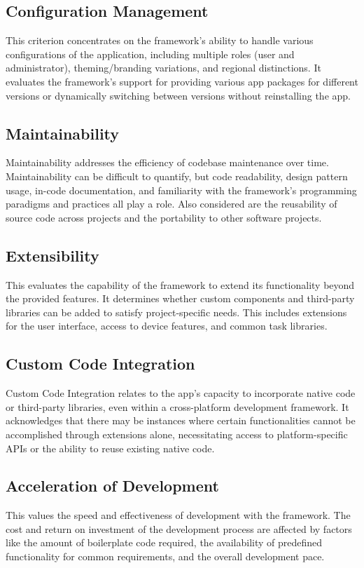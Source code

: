 \subsection{Configuration Management}
This criterion concentrates on the framework's ability to handle various configurations of the application, including multiple roles (user and administrator), theming/branding variations, and regional distinctions. It evaluates the framework's support for providing various app packages for different versions or dynamically switching between versions without reinstalling the app.

\subsection{Maintainability}
Maintainability addresses the efficiency of codebase maintenance over time. Maintainability can be difficult to quantify, but code readability, design pattern usage, in-code documentation, and familiarity with the framework's programming paradigms and practices all play a role. Also considered are the reusability of source code across projects and the portability to other software projects.

\subsection{Extensibility}
This evaluates the capability of the framework to extend its functionality beyond the provided features. It determines whether custom components and third-party libraries can be added to satisfy project-specific needs. This includes extensions for the user interface, access to device features, and common task libraries.

\subsection{Custom Code Integration}
Custom Code Integration relates to the app's capacity to incorporate native code or third-party libraries, even within a cross-platform development framework. It acknowledges that there may be instances where certain functionalities cannot be accomplished through extensions alone, necessitating access to platform-specific APIs or the ability to reuse existing native code.

\subsection{Acceleration of Development}
This values the speed and effectiveness of development with the framework. The cost and return on investment of the development process are affected by factors like the amount of boilerplate code required, the availability of predefined functionality for common requirements, and the overall development pace.

